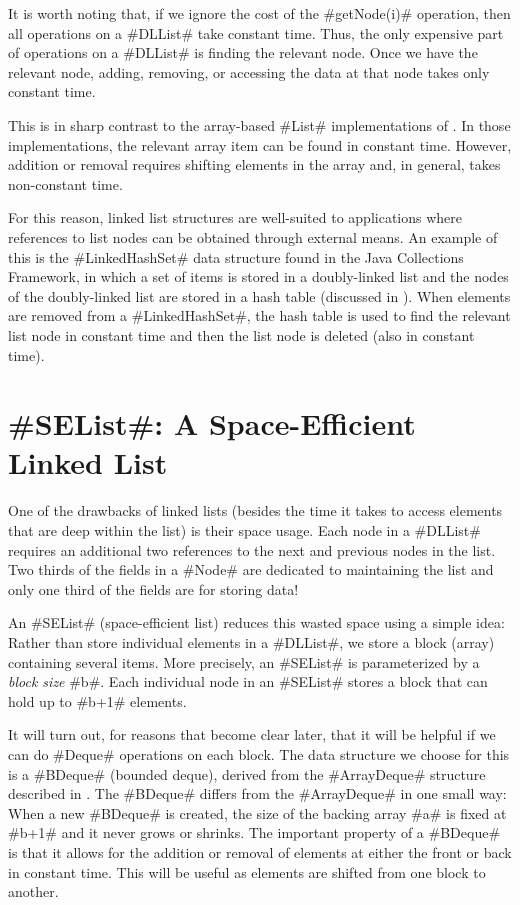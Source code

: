 It is worth noting that, if we ignore the cost of the #getNode(i)#
operation, then all operations on a #DLList# take constant time.
Thus, the only expensive part of operations on a #DLList# is finding
the relevant node.  Once we have the relevant node, adding, removing,
or accessing the data at that node takes only constant time.

This is in sharp contrast to the array-based #List# implementations of
. In those implementations, the relevant array
item can be found in constant time. However, addition or removal requires
shifting elements in the array and, in general, takes non-constant time.

For this reason, linked list structures are well-suited to applications
where references to list nodes can be obtained through external means.
An example of this is the #LinkedHashSet# data structure found in the
Java Collections Framework, in which a set of items is stored in a
doubly-linked list and the nodes of the doubly-linked list are stored
in a hash table (discussed in ).  When elements
are removed from a #LinkedHashSet#, the hash table is used to find the
relevant list node in constant time and then the list node is deleted
(also in constant time).


\section{#SEList#: A Space-Efficient Linked List}

One of the drawbacks of linked lists (besides the time it takes to
access elements that are deep within the list) is their space usage.
Each node in a #DLList# requires an additional two references to the next
and previous nodes in the list.  Two thirds of the fields in a #Node#
are dedicated to maintaining the list and only one third of the fields
are for storing data!

An #SEList# (space-efficient list) reduces this wasted space using
a simple idea: Rather than store individual elements in a #DLList#,
we store a block (array) containing several items. More precisely, an
#SEList# is parameterized by a \emph{block size} #b#. Each individual
node in an #SEList# stores a block that can hold up to #b+1# elements.

It will turn out, for reasons that become clear later, that it will
be helpful if we can do #Deque# operations on each block.  The data
structure we choose for this is a #BDeque# (bounded deque), derived
from the #ArrayDeque# structure described in .
The #BDeque# differs from the #ArrayDeque# in one small way: When a
new #BDeque# is created, the size of the backing array #a#
is fixed at #b+1# and it never grows or shrinks.
The important property of a #BDeque# is that it allows for the addition or
removal of elements at either the front or back in constant time. This
will be useful as elements are shifted from one block to another.


